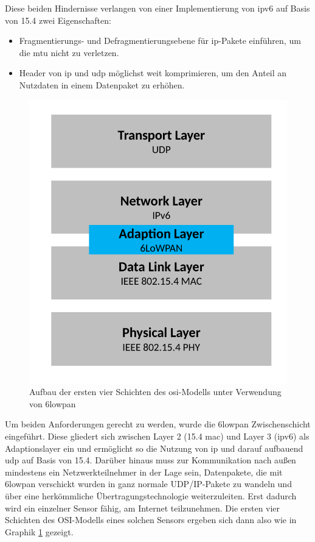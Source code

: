 Diese beiden Hindernisse verlangen von einer Implementierung von \ac{ipv6} auf Basis von \ac{15.4} zwei Eigenschaften:
\begin{itemize}
	\item Fragmentierungs- und Defragmentierungsebene für \ac{ip}-Pakete einführen, um die \ac{mtu} nicht zu verletzen.
	\item Header von \ac{ip} und \ac{udp} möglichst weit komprimieren, um den Anteil an Nutzdaten in einem Datenpaket zu erhöhen.
\end{itemize}
\begin{figure}
	\centering
	\includegraphics[width=\textwidth/2]{Grafiken-Alex/6lowpan-osi.pdf}
	\caption{Aufbau der ersten vier Schichten des \ac{osi}-Modells unter Verwendung von \ac{6lowpan}}
	\label{6lowpan-osi}
\end{figure}
Um beiden Anforderungen gerecht zu werden, wurde die \ac{6lowpan} Zwischenschicht eingeführt. Diese gliedert sich zwischen Layer 2 (\ac{15.4} \ac{mac}) und Layer 3 (\ac{ipv6}) als Adaptionslayer ein und ermöglicht so die Nutzung von \ac{ip} und darauf aufbauend \ac{udp} auf Basis von \ac{15.4}. Darüber hinaus muss zur Kommunikation nach außen mindestens ein Netzwerkteilnehmer in der Lage sein, Datenpakete, die mit \ac{6lowpan} verschickt wurden in ganz normale UDP/IP-Pakete zu wandeln und über eine herkömmliche Übertragungstechnologie weiterzuleiten. Erst dadurch wird ein einzelner Sensor fähig, am Internet teilzunehmen. Die ersten vier Schichten des OSI-Modells eines solchen Sensors ergeben sich dann also wie in Graphik \ref{6lowpan-osi} gezeigt.